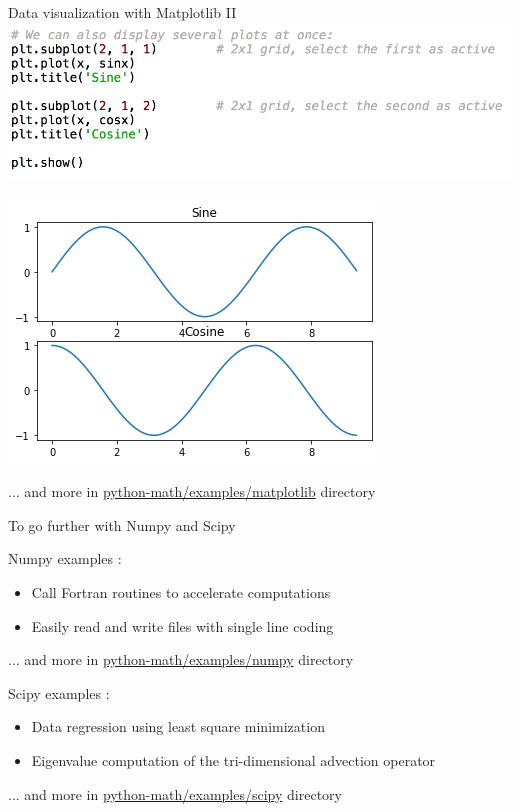 \documentclass[11pt,unknownkeysallowed,usenames,dvipsnames]{beamer}
\begin{document}
\begin{frame}{Data visualization with Matplotlib II}
	\includegraphics[width=0.9\linewidth]{code-matplotlib2}
	
	\centering    \includegraphics[width=0.4\linewidth]{plot2}
    
    ... and more in    
    \href{https://gitlab.unige.ch/Thibaut.Lunet/python-math/tree/master/examples/matplotlib}{python-math/examples/matplotlib} directory
\end{frame}

\begin{frame}{To go further with Numpy and Scipy}
	\small
	\vspace{5pt}
	\begin{block}{Numpy examples :}
		\begin{itemize}
			\item Call Fortran routines to accelerate computations
			\item Easily read and write files with single line coding
		\end{itemize}
	\end{block}
	\vspace*{-7pt}
	... and more in    
	\href{https://gitlab.unige.ch/Thibaut.Lunet/python-math/tree/master/examples/numpy}{python-math/examples/numpy} directory
	\vspace*{6pt}
	\begin{block}{Scipy examples :}
		\begin{itemize}
			\item Data regression using least square minimization
			\item Eigenvalue computation of the tri-dimensional advection operator
		\end{itemize}
	\end{block}
	\vspace*{-7pt}
	... and more in    
	\href{https://gitlab.unige.ch/Thibaut.Lunet/python-math/tree/master/examples/scipy}{python-math/examples/scipy} directory \\
\end{frame}
\end{document}
